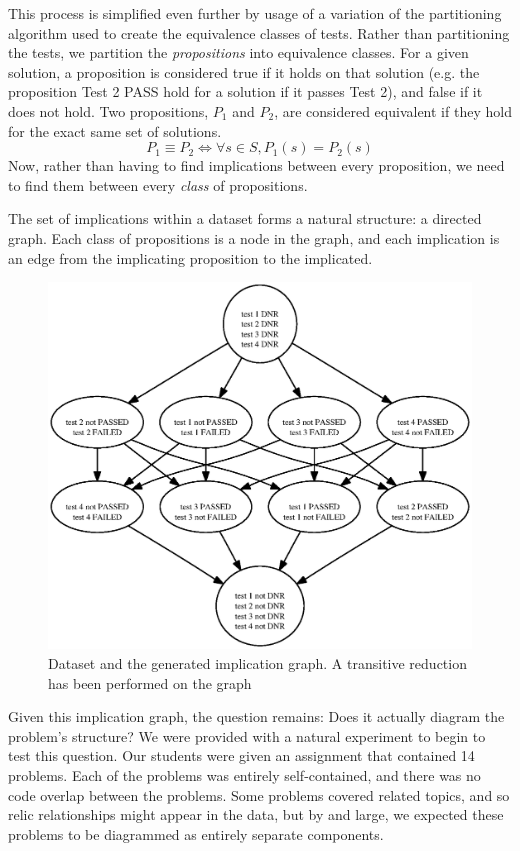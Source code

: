 \documentclass[11pt]{article}
\begin{document}
This process is simplified even further by usage of a variation of the partitioning algorithm used to create the equivalence classes of tests. Rather than partitioning the tests, we partition the \emph{propositions} into equivalence classes. For a given solution, a proposition is considered true if it holds on that solution (e.g. the proposition Test 2 PASS hold for a solution if it passes Test 2), and false if it does not hold. Two propositions, $P_1$ and $P_2$, are considered equivalent if they hold for the exact same set of solutions.
$$P_1 \equiv P_2 \iff \forall s \in S, P_1(s) = P_2(s)$$
Now, rather than having to find implications between every proposition, we need to find them between every \emph{class} of propositions.

The set of implications within a dataset forms a natural structure: a directed graph. Each class of propositions is a node in the graph, and each implication is an edge from the implicating proposition to the implicated.

\begin{figure}

\includegraphics[scale=0.75]{toyimpl.ps}
\caption{Dataset and the generated implication graph. A transitive reduction has been performed on the graph}
\end{figure}

Given this implication graph, the question remains: Does it actually diagram the problem's structure? We were provided with a natural experiment to begin to test this question. Our students were given an assignment that contained 14 problems. Each of the problems was entirely self-contained, and there was no code overlap between the problems. Some problems covered related topics, and so relic relationships might appear in the data, but by and large, we expected these problems to be diagrammed as entirely separate components.
\end{document}
